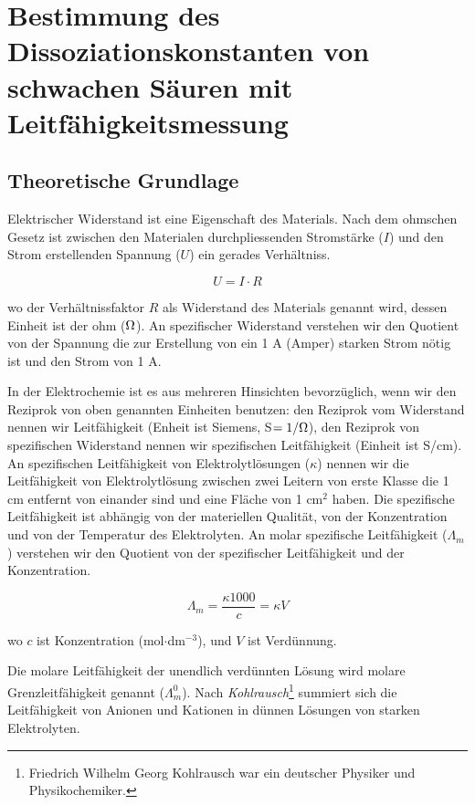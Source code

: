\section{Bestimmung des Dissoziationskonstanten von schwachen Säuren mit Leitfähigkeitsmessung}
\subsection{Theoretische Grundlage}

Elektrischer Widerstand ist eine Eigenschaft des Materials. Nach dem ohmschen Gesetz ist zwischen den Materialen durchpliessenden Stromstärke ($I$) und den Strom erstellenden Spannung ($U$) ein gerades Verhältniss.


\begin{equation}
\label{eq:ohm}
	U
	=
	I
	\cdot
	R
\end{equation}

wo der Verhältnissfaktor $R$ als Widerstand des Materials genannt wird, dessen Einheit ist der ohm ($\ohm$).
An spezifischer Widerstand verstehen wir den Quotient von der Spannung die zur Erstellung von ein 1 A (Amper) starken Strom nötig ist und den Strom von 1 A. %

In der Elektrochemie ist es aus mehreren Hinsichten bevorzüglich, wenn wir den Reziprok von oben genannten Einheiten benutzen: den Reziprok vom Widerstand nennen wir Leitfähigkeit (Enheit ist Siemens, S$ = 1 / \ohm$), den Reziprok von spezifischen Widerstand nennen wir spezifischen Leitfähigkeit (Einheit ist S/cm).
An spezifischen Leitfähigkeit von Elektrolytlösungen ($\kappa$) nennen wir die Leitfähigkeit von Elektrolytlösung zwischen zwei Leitern von erste Klasse die 1 cm entfernt von einander sind und eine Fläche von 1 cm$^2$ haben.
Die spezifische Leitfähigkeit ist abhängig von der materiellen Qualität, von der Konzentration und von der Temperatur des Elektrolyten.
An molar spezifische Leitfähigkeit ($\Lambda _m$) verstehen wir den Quotient von der spezifischer Leitfähigkeit und der Konzentration.

\begin{equation}
\label{eq:lambdam}
        \Lambda_m
        =
        \frac
		{\kappa 1000 }
		{c}
	=
	\kappa V
\end{equation}

wo $c$ ist Konzentration (mol$\cdot$dm$^{-3}$), und $V$ ist Verdünnung.

Die molare Leitfähigkeit der unendlich verdünnten Lösung wird molare Grenzleitfähigkeit genannt ($\Lambda _m^0$).
Nach \emph{Kohlrausch}\footnote{Friedrich Wilhelm Georg Kohlrausch war ein deutscher Physiker und Physikochemiker.} summiert sich die Leitfähigkeit von Anionen und Kationen in dünnen Lösungen von starken Elektrolyten. 

